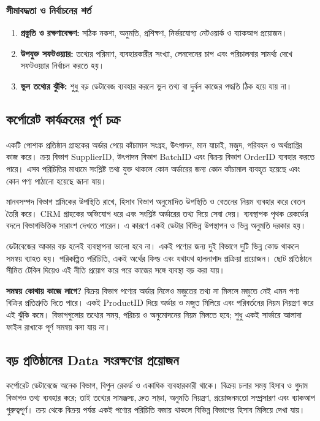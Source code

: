 \subsubsection{সীমাবদ্ধতা ও নির্বাচনের শর্ত}
\begin{enumerate}
\item \textbf{প্রস্তুতি ও রক্ষণাবেক্ষণ:} সঠিক নকশা, অনুমতি, প্রশিক্ষণ, নির্ভরযোগ্য নেটওয়ার্ক ও ব্যাকআপ প্রয়োজন।
\item \textbf{উপযুক্ত সফটওয়্যার:} তথ্যের পরিমাণ, ব্যবহারকারীর সংখ্যা, লেনদেনের চাপ এবং পরিচালনার সামর্থ্য দেখে সফটওয়্যার নির্বাচন করতে হয়।
\item \textbf{ভুল তথ্যের ঝুঁকি:} শুধু বড় ডেটাবেজ ব্যবহার করলে ভুল তথ্য বা দুর্বল কাজের পদ্ধতি ঠিক হয়ে যায় না।
\end{enumerate}

\subsection{কর্পোরেট কার্যক্রমের পূর্ণ চক্র}
একটি পোশাক প্রতিষ্ঠান গ্রাহকের অর্ডার পেয়ে কাঁচামাল সংগ্রহ, উৎপাদন, মান যাচাই, মজুদ, পরিবহন ও অর্থপ্রাপ্তির কাজ করে। ক্রয় বিভাগ SupplierID, উৎপাদন বিভাগ BatchID এবং বিক্রয় বিভাগ OrderID ব্যবহার করতে পারে। এসব পরিচিতির মাধ্যমে সংশ্লিষ্ট তথ্য যুক্ত থাকলে কোন অর্ডারের জন্য কোন কাঁচামাল ব্যবহৃত হয়েছে এবং কোন পণ্য পাঠানো হয়েছে জানা যায়।

মানবসম্পদ বিভাগ শ্রমিকের উপস্থিতি রাখে, হিসাব বিভাগ অনুমোদিত উপস্থিতি ও বেতনের নিয়ম ব্যবহার করে বেতন তৈরি করে। CRM গ্রাহকের অভিযোগ ধরে এবং সংশ্লিষ্ট অর্ডারের তথ্য দিয়ে সেবা দেয়। ব্যবস্থাপক পৃথক রেকর্ডের বদলে বিভাগভিত্তিক সারাংশ দেখতে পারেন। এ কারণে একই ডেটার বিভিন্ন উপস্থাপন ও ভিন্ন অনুমতি দরকার হয়।

ডেটাবেজের আকার বড় হলেই ব্যবস্থাপনা ভালো হবে না। একই পণ্যের জন্য দুই বিভাগে দুটি ভিন্ন কোড থাকলে সমন্বয় ব্যাহত হয়। পরিকল্পিত পরিচিতি, একই অর্থের ফিল্ড এবং যথাযথ হালনাগাদ প্রক্রিয়া প্রয়োজন। ছোট প্রতিষ্ঠানে সীমিত টেবিল দিয়েও এই নীতি প্রয়োগ করে পরে কাজের সঙ্গে ব্যবস্থা বড় করা যায়।


\textbf{সমন্বয় কোথায় কাজে লাগে?} বিক্রয় বিভাগ পণ্যের অর্ডার নিলেও মজুতের তথ্য না মিললে মজুতে নেই এমন পণ্য বিক্রির প্রতিশ্রুতি দিতে পারে। একই ProductID দিয়ে অর্ডার ও মজুত মিলিয়ে এবং পরিবর্তনের নিয়ম নিয়ন্ত্রণ করে এই ঝুঁকি কমে। বিভাগগুলোর তথ্যের সময়, পরিচয় ও অনুমোদনের নিয়ম মিলতে হবে; শুধু একই সার্ভারে আলাদা ফাইল রাখাকে পূর্ণ সমন্বয় বলা যায় না।

\subsection{বড় প্রতিষ্ঠানের Data সংরক্ষণের প্রয়োজন}
কর্পোরেট ডেটাবেজে অনেক বিভাগ, বিপুল রেকর্ড ও একাধিক ব্যবহারকারী থাকে। বিক্রয় চলার সময় হিসাব ও গুদাম বিভাগও তথ্য ব্যবহার করে; তাই তথ্যের সামঞ্জস্য, দ্রুত সাড়া, অনুমতি নিয়ন্ত্রণ, প্রয়োজনমতো সম্প্রসারণ এবং ব্যাকআপ গুরুত্বপূর্ণ। ক্রয় থেকে বিক্রয় পর্যন্ত একই পণ্যের পরিচিতি বজায় থাকলে বিভিন্ন বিভাগের হিসাব মিলিয়ে দেখা যায়।


